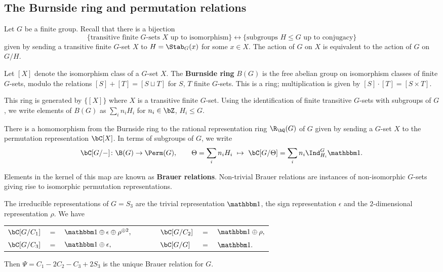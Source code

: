 \subsection{The Burnside ring and permutation relations}

Let $G$ be a finite group. Recall that there is a bijection  
\[ \{ \text{transitive finite }G\text{-sets } X  \text{ up to isomorphism}\}\leftrightarrow  \{ \text{subgroups } H \leq G \text{ up to conjugacy} \} \] 
given by sending a transitive finite $G$-set $X$ to $H = \Stab_{G}(x)$ for some $x \in X$.  The action of $G$ on $X$ is equivalent to the action of $G$ on $G / H$. 

\begin{defn}
Let $[X]$ denote the isomorphism class of a $G$-set $X$. 
The \textbf{Burnside ring} $B(G)$ is the free abelian group on isomorphism classes of finite $G$-sets, modulo the relations  $[S] + [T] = [S \sqcup T]$ for $S$, $T$ finite $G$-sets. This is a ring; multiplication is given by $[S] \cdot [T] = [S \times T]$.
\end{defn}

This ring is generated by $\{ [X] \}$ where $X$ is a transitive finite $G$-set. Using the identification of finite transitive $G$-sets with subgroups of $G$, we write elements of $B(G)$ as $\sum_i n_i H_i$ for $n_i \in \bZ$, $H_i \leq G$. 

\begin{notn}
There is a homomorphism from the Burnside ring to the rational representation ring $\R_{\bQ}(G)$ of $G$ given by sending a $G$-set $X$ to the permutation representation $\bC[X]$. In terms of subgroups of $G$, we write
\[ \bC[G / -] \colon \B(G) \to \Perm(G),  \qquad \Theta = \sum_i n_i H_i \ \mapsto \ \bC[G / \Theta ] = \sum_i n_i \Ind_{H_i}^G \trivial. \]
\end{notn}
Elements in the kernel of this map are known as \textbf{Brauer relations}. Non-trivial Brauer relations are instances of non-isomorphic $G$-sets giving rise to isomorphic permutation representations. 

\begin{example}
    The irreducible representations of $G = S_3$ are the trivial representation $\trivial$, the sign representation $\epsilon$ and the $2$-dimensional representation $\rho$.
    We have
    \begin{table}[H]
        \centering
    \begin{tabular}{l l l l l l l}
        $\bC[G / C_1]$ & $=$ & $\trivial \oplus \epsilon \oplus \rho^{\oplus 2},$ & $\qquad$ &
        $\bC[G / C_2]$ & $=$ & $\trivial \oplus \rho,$\\ 
        $\bC[G / C_3]$ & $=$ & $\trivial \oplus \epsilon,$ & $\qquad$ &
        $\bC[G / G]$ & $=$ & $\trivial.$  
    \end{tabular}
\end{table}
    Then $\Psi = C_1  - 2 C_2 - C_3 + 2S_3$ is the unique Brauer relation for $G$.
\end{example}

